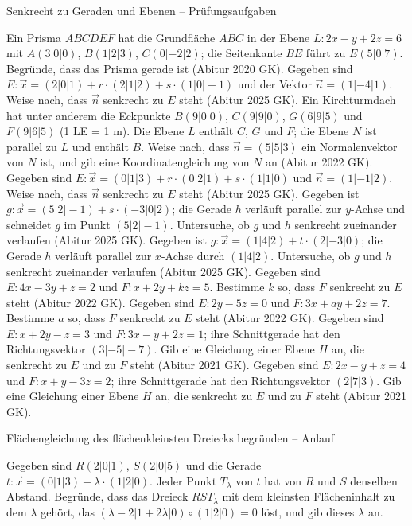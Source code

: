 \begin{aufgabe}{Senkrecht zu Geraden und Ebenen – Prüfungsaufgaben}
\begin{teile}
\teil Ein Prisma $ABCDEF$ hat die Grundfläche $ABC$ in der Ebene $L\colon 2x - y + 2z = 6$ mit $A(3 | 0 | 0)$, $B(1 | 2 | 3)$, $C(0 | -2 | 2)$; die Seitenkante $BE$ führt zu $E(5 | 0 | 7)$. Begründe, dass das Prisma gerade ist \hfill (Abitur 2020 GK).
\teil Gegeben sind $E\colon \vec x = (2 | 0 | 1) + r \cdot (2 | 1 | 2) + s \cdot (1 | 0 | -1)$ und der Vektor $\vec n = (1 | -4 | 1)$. Weise nach, dass $\vec n$ senkrecht zu $E$ steht \hfill (Abitur 2025 GK).
\teil Ein Kirchturmdach hat unter anderem die Eckpunkte $B(9 | 0 | 0)$, $C(9 | 9 | 0)$, $G(6 | 9 | 5)$ und $F(9 | 6 | 5)$ (1 LE = 1 m). Die Ebene $L$ enthält $C$, $G$ und $F$; die Ebene $N$ ist parallel zu $L$ und enthält $B$. Weise nach, dass $\vec n = (5 | 5 | 3)$ ein Normalenvektor von $N$ ist, und gib eine Koordinatengleichung von $N$ an \hfill (Abitur 2022 GK).
\teil Gegeben sind $E\colon \vec x = (0 | 1 | 3) + r \cdot (0 | 2 | 1) + s \cdot (1 | 1 | 0)$ und $\vec n = (1 | -1 | 2)$. Weise nach, dass $\vec n$ senkrecht zu $E$ steht \hfill (Abitur 2025 GK).
\teil Gegeben ist $g\colon \vec x = (5 | 2 | -1) + s \cdot (-3 | 0 | 2)$; die Gerade $h$ verläuft parallel zur $y$-Achse und schneidet $g$ im Punkt $(5 | 2 | -1)$. Untersuche, ob $g$ und $h$ senkrecht zueinander verlaufen \hfill (Abitur 2025 GK).
\teil Gegeben ist $g\colon \vec x = (1 | 4 | 2) + t \cdot (2 | -3 | 0)$; die Gerade $h$ verläuft parallel zur $x$-Achse durch $(1 | 4 | 2)$. Untersuche, ob $g$ und $h$ senkrecht zueinander verlaufen \hfill (Abitur 2025 GK).
\teil Gegeben sind $E\colon 4x - 3y + z = 2$ und $F\colon x + 2y + kz = 5$. Bestimme $k$ so, dass $F$ senkrecht zu $E$ steht \hfill (Abitur 2022 GK).
\teil Gegeben sind $E\colon 2y - 5z = 0$ und $F\colon 3x + ay + 2z = 7$. Bestimme $a$ so, dass $F$ senkrecht zu $E$ steht \hfill (Abitur 2022 GK).
\teil Gegeben sind $E\colon x + 2y - z = 3$ und $F\colon 3x - y + 2z = 1$; ihre Schnittgerade hat den Richtungsvektor $(3 | -5 | -7)$. Gib eine Gleichung einer Ebene $H$ an, die senkrecht zu $E$ und zu $F$ steht \hfill (Abitur 2021 GK).
\teil Gegeben sind $E\colon 2x - y + z = 4$ und $F\colon x + y - 3z = 2$; ihre Schnittgerade hat den Richtungsvektor $(2 | 7 | 3)$. Gib eine Gleichung einer Ebene $H$ an, die senkrecht zu $E$ und zu $F$ steht \hfill (Abitur 2021 GK).
\end{teile}
\end{aufgabe}

\begin{aufgabe}{Flächengleichung des flächenkleinsten Dreiecks begründen – Anlauf}
\begin{teile}
\teil Gegeben sind $R(2 | 0 | 1)$, $S(2 | 0 | 5)$ und die Gerade $t\colon \vec x = (0 | 1 | 3) + \lambda \cdot (1 | 2 | 0)$. Jeder Punkt $T_\lambda$ von $t$ hat von $R$ und $S$ denselben Abstand. Begründe, dass das Dreieck $RST_\lambda$ mit dem kleinsten Flächeninhalt zu dem $\lambda$ gehört, das $(\lambda - 2 | 1 + 2\lambda | 0) \circ (1 | 2 | 0) = 0$ löst, und gib dieses $\lambda$ an.
\end{teile}
\end{aufgabe}

